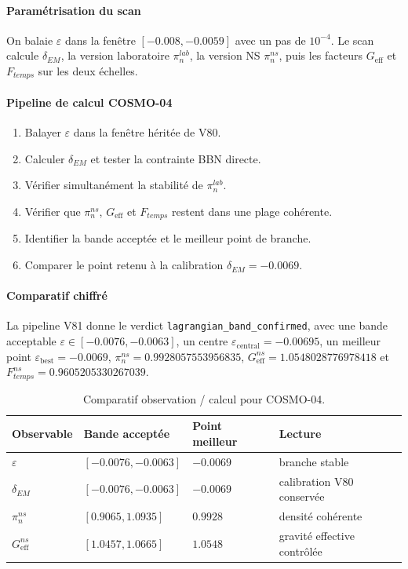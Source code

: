 \documentclass[11pt,a4paper]{article}
\begin{document}
\paragraph{Paramétrisation du scan}
On balaie $\varepsilon$ dans la fenêtre $[-0.008,-0.0059]$ avec un pas de $10^{-4}$. Le scan calcule $\delta_{EM}$, la version laboratoire $\pi_n^{lab}$, la version NS $\pi_n^{ns}$, puis les facteurs $G_{\mathrm{eff}}$ et $F_{temps}$ sur les deux échelles.

\paragraph{Pipeline de calcul COSMO-04}
\begin{enumerate}[leftmargin=*,itemsep=0.2em,topsep=0.2em]
\item Balayer $\varepsilon$ dans la fenêtre héritée de V80.
\item Calculer $\delta_{EM}$ et tester la contrainte BBN directe.
\item Vérifier simultanément la stabilité de $\pi_n^{lab}$.
\item Vérifier que $\pi_n^{ns}$, $G_{\mathrm{eff}}$ et $F_{temps}$ restent dans une plage cohérente.
\item Identifier la bande acceptée et le meilleur point de branche.
\item Comparer le point retenu à la calibration $\delta_{EM}=-0.0069$.
\end{enumerate}

\paragraph{Comparatif chiffré}
La pipeline V81 donne le verdict \texttt{lagrangian\_band\_confirmed}, avec une bande acceptable $\varepsilon\in[-0.0076,-0.0063]$, un centre $\varepsilon_{\mathrm{central}}=-0.00695$, un meilleur point $\varepsilon_{\mathrm{best}}=-0.0069$, $\pi_n^{ns}=0.9928057553956835$, $G_{\mathrm{eff}}^{ns}=1.0548028776978418$ et $F_{temps}^{ns}=0.9605205330267039$.

\begin{table}[htbp]
\centering
\begin{tabular}{>{\raggedright\arraybackslash}p{3.2cm} >{\centering\arraybackslash}p{3.2cm} >{\centering\arraybackslash}p{3.4cm} >{\centering\arraybackslash}p{3.4cm}}
\toprule
Observable & Bande acceptée & Point meilleur & Lecture \\
\midrule
$\varepsilon$ & $[-0.0076,-0.0063]$ & $-0.0069$ & branche stable \\
$\delta_{EM}$ & $[-0.0076,-0.0063]$ & $-0.0069$ & calibration V80 conservée \\
$\pi_n^{ns}$ & $[0.9065,1.0935]$ & $0.9928$ & densité cohérente \\
$G_{\mathrm{eff}}^{ns}$ & $[1.0457,1.0665]$ & $1.0548$ & gravité effective contrôlée \\
\bottomrule
\end{tabular}
\caption{Comparatif observation / calcul pour COSMO-04.}
\end{table}
\end{document}
